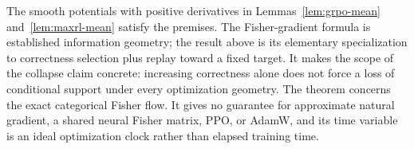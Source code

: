 The smooth potentials with positive derivatives in
Lemmas~\ref{lem:grpo-mean} and~\ref{lem:maxrl-mean} satisfy the premises. The Fisher-gradient formula
is established information geometry; the result above is its elementary
specialization to correctness selection plus replay toward a fixed target.
It makes the scope of the collapse claim concrete: increasing correctness
alone does not force a loss of conditional support under every optimization
geometry. The theorem concerns the exact categorical Fisher flow. It gives
no guarantee for approximate natural gradient, a shared neural Fisher
matrix, PPO, or AdamW, and its time variable is an ideal optimization clock
rather than elapsed training time.

